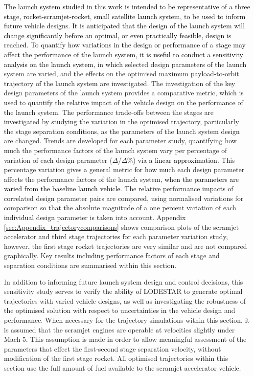 \textcolor{black}{The launch system studied in this work is intended to be representative of a three stage, rocket-scramjet-rocket, small satellite launch system, to be used to inform future vehicle designs. It is anticipated that the design of the launch system will change significantly before an optimal, or even practically feasible, design is reached. 
	To quantify how variations in the design or performance of a stage may affect the performance of the launch system, it is useful to conduct a sensitivity analysis on the launch system}, in which selected design parameters of the launch system are varied, and the effects on the optimised maximum payload-to-orbit trajectory of the launch system are investigated.
The investigation of the key design parameters of the launch system provides a comparative metric, which is used to quantify the relative impact of the vehicle design on the performance of the launch system. The performance trade-offs between the stages are investigated by studying the variation in the optimised trajectory, particularly the stage separation conditions, as the parameters of the launch system design are changed. 
Trends are developed for each parameter study, quantifying how much the performance factors of the launch system vary per percentage of variation of each design parameter ($\Delta$/$\Delta$\%) \textcolor{black}{via a linear approximation}. This percentage variation gives a general metric for how much each design parameter affects the performance factors of the launch system, \textcolor{black}{when the parameters are varied from the baseline launch vehicle}. The relative performance impacts of correlated design parameter pairs are compared, using normalised variations for comparison so that the absolute magnitude of a one percent variation of each individual design parameter is taken into account.
Appendix \ref{sec:Appendix_trajectorycomparisons} shows comparison plots of the scramjet accelerator and third stage trajectories for each parameter variation study, however, the first stage rocket trajectories are very similar and are not compared graphically. Key results including performance factors of each stage and separation conditions are summarised within this section.


In addition to informing future launch system design and control decisions, this sensitivity study serves to verify the ability of LODESTAR to generate optimal trajectories with varied vehicle designs, as well as investigating the robustness of the optimised solution with respect to uncertainties in the vehicle design and performance.
When necessary for the trajectory simulations within this section, it is assumed that the scramjet engines are operable at velocities slightly under Mach 5. This assumption is made in order to allow meaningful assessment of the parameters that effect the first-second stage separation velocity, without modification of the first stage rocket.
All optimised trajectories within this section use the full amount of fuel available to the scramjet accelerator vehicle. 


